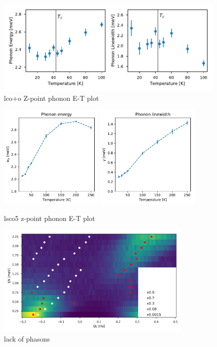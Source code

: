 \begin{figure}
    \centering
    \includegraphics[width=\textwidth]{fig/lowen/lcoo_phonon_energies.pdf}
    \caption[lco+o Z-point phonon E-T plot]{lco+o Z-point phonon E-T plot}
    \label{fig:lcoo_zpoint_phonon_energies}
\end{figure}

\begin{figure}
    \centering
    \includegraphics[width=0.45\textwidth]{fig/lowen/lsco5_phonon_energy.pdf}
    \includegraphics[width=0.45\textwidth]{fig/lowen/lsco5_phonon_linewidth.pdf}
    \caption[lsco5 z-point phonon E-T plot]{lsco5 z-point phonon E-T plot}
    \label{fig:lsco5_zpoint_phonon_energies}
\end{figure}

\begin{figure}
    \centering
    \includegraphics[width=0.85\textwidth]{fig/lowen/phason_colorplot.png}
    \caption[lack of phasons]{lack of phasons}
    \label{fig:lcoo_phasons_colorplot}
\end{figure}
